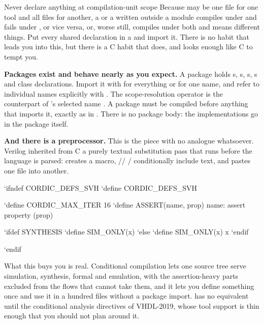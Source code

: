 \begin{gotcha}{Never declare anything at compilation-unit scope}
Because  may be one file for one tool and all files for another,
a  or a  written outside a module compiles under
 and fails under , or vice versa, or, worse still,
compiles under both and means different things. Put every shared declaration in
a  and import it. There is no \VHDL{} habit that leads you into
this, but there is a C habit that does, and \SV{} looks enough like C to
tempt you.
\end{gotcha}

\textbf{Packages exist and behave nearly as you expect.} A
\SV{} package holds s, s, s,
s and class declarations. Import it with  for everything or  for one
name, and refer to individual names explicitly with
. The scope-resolution operator \code{::} is the
counterpart of \VHDL{}'s selected name . A
package must be compiled before anything that imports it, exactly as in
\VHDL{}. There is no package body: the implementations go in the package
itself.

\textbf{And there is a preprocessor.} This is the piece
with no \VHDL{} analogue whatsoever. Verilog inherited from C a purely textual
substitution pass that runs before the language is parsed:
 creates a macro, \slash{}\slash{}
\slash{} conditionally include text, and
 pastes one file into another.

\begin{svcode}[caption={Compiler directives: text substitution, not language},label={lst:philosophy:defines}]
`ifndef CORDIC_DEFS_SVH
`define CORDIC_DEFS_SVH

`define CORDIC_MAX_ITER 16
`define ASSERT(name, prop) name: assert property (prop)

`ifdef SYNTHESIS
  `define SIM_ONLY(x)
`else
  `define SIM_ONLY(x) x
`endif

`endif
\end{svcode}

What this buys you is real. Conditional compilation lets one source tree serve
simulation, synthesis, formal and emulation, with the assertion-heavy parts
excluded from the flows that cannot take them, and it lets you define something
once and use it in a hundred files without a package import. \VHDL{} has no
equivalent until the conditional analysis directives of VHDL-2019, whose tool
support is thin enough that you should not plan around it.


